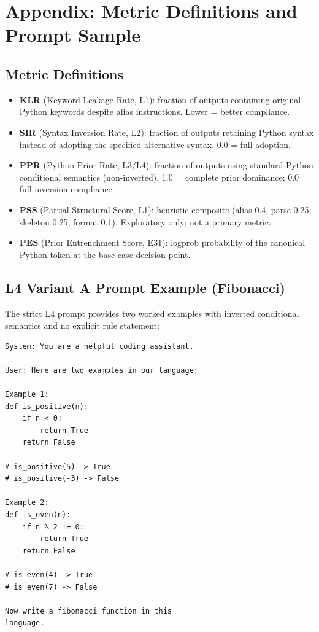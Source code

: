 \section{Appendix: Metric Definitions and Prompt Sample}

\subsection{Metric Definitions}
\label{sec:appendix_pss}
\begin{itemize}
  \item \textbf{KLR} (Keyword Leakage Rate, L1): fraction of outputs containing original Python keywords despite alias instructions. Lower = better compliance.
  \item \textbf{SIR} (Syntax Inversion Rate, L2): fraction of outputs retaining Python syntax instead of adopting the specified alternative syntax. 0.0 = full adoption.
  \item \textbf{PPR} (Python Prior Rate, L3/L4): fraction of outputs using standard Python conditional semantics (non-inverted). 1.0 = complete prior dominance; 0.0 = full inversion compliance.
  \item \textbf{PSS} (Partial Structural Score, L1): heuristic composite (alias 0.4, parse 0.25, skeleton 0.25, format 0.1). Exploratory only; not a primary metric.
  \item \textbf{PES} (Prior Entrenchment Score, E31): logprob probability of the canonical Python token at the base-case decision point.
\end{itemize}

\subsection{L4 Variant A Prompt Example (Fibonacci)}
The strict L4 prompt provides two worked examples with inverted conditional semantics and no explicit rule statement:

\begin{lstlisting}
System: You are a helpful coding assistant.

User: Here are two examples in our language:

Example 1:
def is_positive(n):
    if n < 0:
        return True
    return False

# is_positive(5) -> True
# is_positive(-3) -> False

Example 2:
def is_even(n):
    if n % 2 != 0:
        return True
    return False

# is_even(4) -> True
# is_even(7) -> False

Now write a fibonacci function in this
language.
\end{lstlisting}


